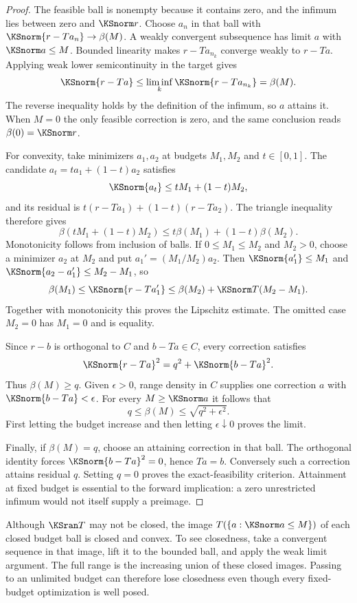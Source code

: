 \begin{proof}
The feasible ball is nonempty because it contains zero, and the infimum lies between zero and $\KSnorm r$. Choose $a_n$ in that ball with $\KSnorm{r-Ta_n}\to\beta(M)$. A weakly convergent subsequence has limit $a$ with $\KSnorm a\le M$. Bounded linearity makes $r-Ta_{n_k}$ converge weakly to $r-Ta$. Applying weak lower semicontinuity in the target gives
\[
 \KSnorm{r-Ta}\le\liminf_k\KSnorm{r-Ta_{n_k}}=\beta(M).
\]
The reverse inequality holds by the definition of the infimum, so $a$ attains it. When $M=0$ the only feasible correction is zero, and the same conclusion reads $\beta(0)=\KSnorm r$.

For convexity, take minimizers $a_1,a_2$ at budgets $M_1,M_2$ and $t\in[0,1]$. The candidate $a_t=ta_1+(1-t)a_2$ satisfies
\[
 \KSnorm{a_t}\le tM_1+(1-t)M_2,
\]
and its residual is $t(r-Ta_1)+(1-t)(r-Ta_2)$. The triangle inequality therefore gives
\[
 \beta(tM_1+(1-t)M_2)\le t\beta(M_1)+(1-t)\beta(M_2).
\]
Monotonicity follows from inclusion of balls. If $0\le M_1\le M_2$ and $M_2>0$, choose a minimizer $a_2$ at $M_2$ and put $a_1'=(M_1/M_2)a_2$. Then $\KSnorm{a_1'}\le M_1$ and $\KSnorm{a_2-a_1'}\le M_2-M_1$, so
\[
 \beta(M_1)\le\KSnorm{r-Ta_1'}
 \le\beta(M_2)+\KSnorm T(M_2-M_1).
\]
Together with monotonicity this proves the Lipschitz estimate. The omitted case $M_2=0$ has $M_1=0$ and is equality.

Since $r-b$ is orthogonal to $C$ and $b-Ta\in C$, every correction satisfies
\begin{equation}\label{KS:eq:range-decomposition}
 \KSnorm{r-Ta}^2=q^2+\KSnorm{b-Ta}^2.
\end{equation}
Thus $\beta(M)\ge q$. Given $\epsilon>0$, range density in $C$ supplies one correction $a$ with $\KSnorm{b-Ta}<\epsilon$. For every $M\ge\KSnorm a$ it follows that
\[
 q\le\beta(M)\le\sqrt{q^2+\epsilon^2}.
\]
First letting the budget increase and then letting $\epsilon\downarrow0$ proves the limit.

Finally, if $\beta(M)=q$, choose an attaining correction in that ball. The orthogonal identity forces $\KSnorm{b-Ta}^2=0$, hence $Ta=b$. Conversely such a correction attains residual $q$. Setting $q=0$ proves the exact-feasibility criterion. Attainment at fixed budget is essential to the forward implication: a zero unrestricted infimum would not itself supply a preimage.
\end{proof}

Although $\KSran T$ may not be closed, the image $T(\{a:\KSnorm a\le M\})$ of each closed budget ball is closed and convex. To see closedness, take a convergent sequence in that image, lift it to the bounded ball, and apply the weak limit argument. The full range is the increasing union of these closed images. Passing to an unlimited budget can therefore lose closedness even though every fixed-budget optimization is well posed.

